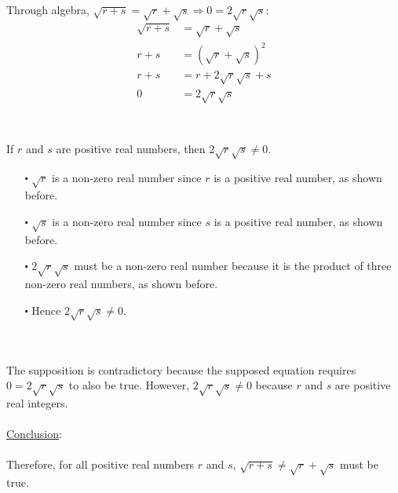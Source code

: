 \documentclass[12pt]{article}
\begin{document}
\newblock
\\ \\
Through algebra, $\sqrt{r+s} = \sqrt{r} + \sqrt{s} \Rightarrow 0 = 2\sqrt{r}\sqrt{s}$:
\begin{align*}
  \sqrt{r+s} &= \sqrt{r} + \sqrt{s} \\
  r+s &= (\sqrt{r} + \sqrt{s})^2 \\
  r+s&= r + 2\sqrt{r}\sqrt{s} + s\\
  0 &= 2\sqrt{r}\sqrt{s}\\
\end{align*}
\newblock
\\ \\
If $r$ and $s$ are positive real numbers, then $2\sqrt{r}\sqrt{s} \neq 0$.
\begin{itemize}
  \item [$\centerdot$] $\sqrt{r}$ is a non-zero real number since $r$ is a positive real number, as shown before.
  \item [$\centerdot$] $\sqrt{s}$ is a non-zero real number since $s$ is a positive real number, as shown before.
  \item [$\centerdot$] $2\sqrt{r}\sqrt{s}$ must be a non-zero real number because 
  it is the product of three non-zero real numbers, as shown before.
  \item [$\centerdot$] Hence $2\sqrt{r}\sqrt{s} \neq 0$.
\end{itemize}
\newblock
\\ \\
The supposition is contradictory because the supposed equation requires $0 = 2\sqrt{r}\sqrt{s}$ to also be true. 
However, $2\sqrt{r}\sqrt{s} \neq 0$ because $r$ and $s$ are positive real integers.
\newblock
\\ \\
\underline{Conclusion}:
\\ \\
Therefore, for all positive real numbers $r$ and $s$, $\sqrt{r+s} \neq \sqrt{r} + \sqrt{s}$ must be true.
\end{document}
